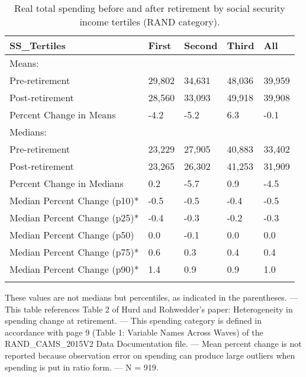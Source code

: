 \begin{table}[tbp] \centering
{}

\caption{Real total spending before and after retirement by social security income tertiles (RAND category).}
\begin{tabularx}{\textwidth}{lCCCC}

\toprule
{SS\_Tertiles}&{First}&{Second}&{Third}&{All} \tabularnewline
\midrule\addlinespace[1.5ex]
Means:&&&& \tabularnewline
\midrule Pre-retirement&29,802&34,631&48,036&39,959 \tabularnewline
Post-retirement&28,560&33,093&49,918&39,908 \tabularnewline
Percent Change in Means&-4.2&-5.2&6.3&-0.1 \tabularnewline
\midrule Medians:&&&& \tabularnewline
\midrule Pre-retirement&23,229&27,905&40,883&33,402 \tabularnewline
Post-retirement&23,265&26,302&41,253&31,909 \tabularnewline
Percent Change in Medians&0.2&-5.7&0.9&-4.5 \tabularnewline
Median Percent Change (p10)*&-0.5&-0.5&-0.4&-0.5 \tabularnewline
Median Percent Change (p25)*&-0.4&-0.3&-0.2&-0.3 \tabularnewline
Median Percent Change (p50)&0.0&-0.1&0.0&0.0 \tabularnewline
Median Percent Change (p75)*&0.6&0.3&0.4&0.4 \tabularnewline
Median Percent Change (p90)*&1.4&0.9&0.9&1.0 \tabularnewline
\bottomrule \addlinespace[1.5ex]

\end{tabularx}
\begin{flushleft}
\footnotesize *These values are not medians but percentiles, as indicated in the parentheses. \linebreak --- \linebreak This table references Table 2 of Hurd and Rohwedder's paper: Heterogeneity in spending change at retirement. \linebreak --- \linebreak This spending category is defined in accordance with page 9 (Table 1: Variable Names Across Waves) of the RAND\_CAMS\_2015V2 Data Documentation file. \linebreak --- \linebreak Mean percent change is not reported because observation error on spending can produce large outliers when spending is put in ratio form. \linebreak --- \linebreak N = 919.
\end{flushleft}
\end{table}
